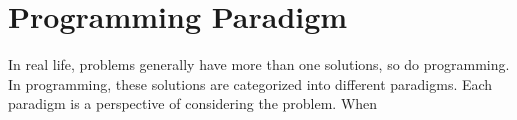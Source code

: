 \documentclass[../main.tex]{subfiles}
\begin{document}
    \section{Programming Paradigm}
    In real life, problems generally have more than one solutions, so do
    programming. In programming, these solutions are categorized into different
    paradigms. Each paradigm is a perspective of considering the problem. When
\end{document}
